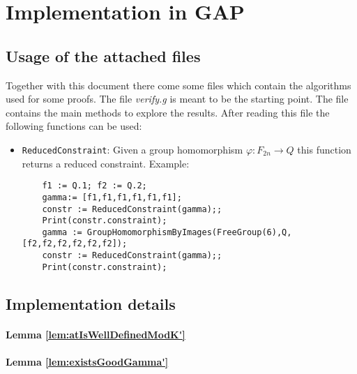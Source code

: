 \documentclass[a4paper,12pt]{article}
\begin{document}
\section{Implementation in GAP}
\subsection{Usage of the attached files}
Together with this document there come some files which contain the algorithms used for some proofs.
The file \emph{verify.g} is meant to be the starting point. The file contains the main methods to explore the results.
After reading this file the following functions can be used:
\begin{itemize}
 \item \lstinline{ReducedConstraint}: Given a group homomorphism $\varphi\colon F_{2n} \to Q$ this function returns a reduced constraint.
 Example: 
 \begin{lstlisting}
    f1 := Q.1; f2 := Q.2;
    gamma:= [f1,f1,f1,f1,f1,f1];
    constr := ReducedConstraint(gamma);;
    Print(constr.constraint);
    gamma := GroupHomomorphismByImages(FreeGroup(6),Q,[f2,f2,f2,f2,f2,f2]);
    constr := ReducedConstraint(gamma);;
    Print(constr.constraint);
\end{lstlisting} 
\end{itemize}

\subsection{Implementation details}
\paragraph{Lemma \ref{lem:atIsWellDefinedModK'}}
\paragraph{Lemma \ref{lem:existsGoodGamma'}}

{}

\appendix
% 
%
\end{document}
